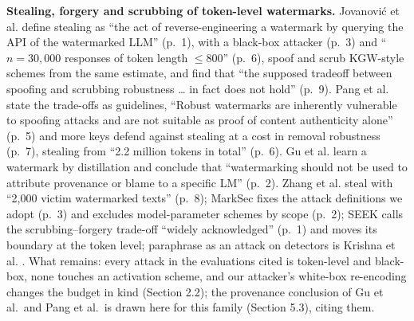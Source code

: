 \documentclass[11pt,letterpaper]{article}
\begin{document}
\textbf{Stealing, forgery and scrubbing of token-level watermarks.} Jovanovi\'c et al. \citep{jovanovic2024stealing} define stealing as ``the act of reverse-engineering a watermark by querying the API of the watermarked LLM'' (p.~1), with a black-box attacker (p.~3) and ``\(n = 30{,}000\) responses of token length \(\leq 800\)'' (p.~6), spoof and scrub KGW-style schemes from the same estimate, and find that ``the supposed tradeoff between spoofing and scrubbing robustness \ldots{} in fact does not hold'' (p.~9). Pang et al. \citep{pang2024nofreelunch} state the trade-offs as guidelines, ``Robust watermarks are inherently vulnerable to spoofing attacks and are not suitable as proof of content authenticity alone'' (p.~5) and more keys defend against stealing at a cost in removal robustness (p.~7), stealing from ``2.2 million tokens in total'' (p.~6). Gu et al. \citep{gu2024learnability} learn a watermark by distillation and conclude that ``watermarking should not be used to attribute provenance or blame to a specific LM'' (p.~2). Zhang et al. \citep{zhang2026beyondseal} steal with ``2,000 victim watermarked texts'' (p.~8); MarkSec \citep{li2026marksec} fixes the attack definitions we adopt (p.~3) and excludes model-parameter schemes by scope (p.~2); SEEK \citep{shen2025seek} calls the scrubbing--forgery trade-off ``widely acknowledged'' (p.~1) and moves its boundary at the token level; paraphrase as an attack on detectors is Krishna et al. \citep{krishna2023paraphrasing}. What remains: every attack in the evaluations cited is token-level and black-box, none touches an activation scheme, and our attacker's white-box re-encoding changes the budget in kind (Section 2.2); the provenance conclusion of Gu et al.~and Pang et al.~is drawn here for this family (Section 5.3), citing them.
\end{document}
